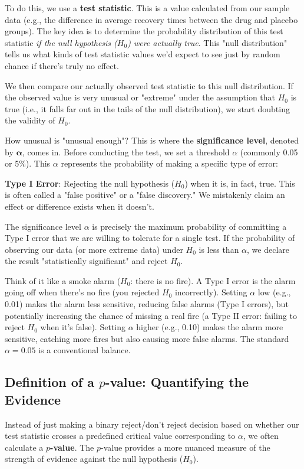 \documentclass[12pt]{book}
\newcommand{\pvalue}{$p$-value}          %
\newcommand{\Hnull}{H_0}                 %
\begin{document}
To do this, we use a \textbf{test statistic}. This is a value calculated from our sample data (e.g., the difference in average recovery times between the drug and placebo groups). The key idea is to determine the probability distribution of this test statistic \emph{if the null hypothesis ($\Hnull$) were actually true}. This "null distribution" tells us what kinds of test statistic values we'd expect to see just by random chance if there's truly no effect.

We then compare our actually observed test statistic to this null distribution. If the observed value is very unusual or "extreme" under the assumption that $\Hnull$ is true (i.e., it falls far out in the tails of the null distribution), we start doubting the validity of $\Hnull$.

How unusual is "unusual enough"? This is where the \textbf{significance level}, denoted by $\boldsymbol{\alpha}$, comes in. Before conducting the test, we set a threshold $\alpha$ (commonly 0.05 or 5\%). This $\alpha$ represents the probability of making a specific type of error:

\textbf{Type I Error}: Rejecting the null hypothesis ($\Hnull$) when it is, in fact, true. This is often called a "false positive" or a "false discovery." We mistakenly claim an effect or difference exists when it doesn't.

The significance level $\alpha$ is precisely the maximum probability of committing a Type I error that we are willing to tolerate for a single test. If the probability of observing our data (or more extreme data) under $\Hnull$ is less than $\alpha$, we declare the result "statistically significant" and reject $\Hnull$.

Think of it like a smoke alarm ($\Hnull$: there is no fire). A Type I error is the alarm going off when there's no fire (you rejected $\Hnull$ incorrectly). Setting $\alpha$ low (e.g., 0.01) makes the alarm less sensitive, reducing false alarms (Type I errors), but potentially increasing the chance of missing a real fire (a Type II error: failing to reject $\Hnull$ when it's false). Setting $\alpha$ higher (e.g., 0.10) makes the alarm more sensitive, catching more fires but also causing more false alarms. The standard $\alpha = 0.05$ is a conventional balance.

\subsection{Definition of a \texorpdfstring{$p$}{p}-value: Quantifying the Evidence}
\label{sec:pvalue}
Instead of just making a binary reject/don't reject decision based on whether our test statistic crosses a predefined critical value corresponding to $\alpha$, we often calculate a \textbf{\pvalue}. The \pvalue{} provides a more nuanced measure of the strength of evidence against the null hypothesis ($\Hnull$).
\end{document}
